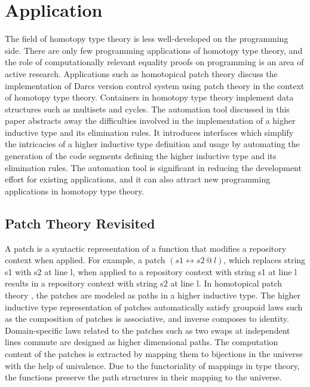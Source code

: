 \documentclass[sigplan,10pt]{acmart}
\begin{document}
\section{Application}

The field of homotopy type theory is less well-developed on the programming side. There are only few programming applications of homotopy type theory, and the role of computationally relevant equality proofs on programming is an area of active research. Applications such as homotopical patch theory \cite{Angiuli-2014} discuss the implementation of Darcs \cite{Darcs-2005} version control system using patch theory \cite{Mimram-2013} \cite{Jason-2009} in the context of homotopy type theory. Containers in homotopy type theory \cite{Altenkirch-2014} \cite{Abbott-2005} implement data structures such as multisets and cycles. The automation tool discussed in this paper abstracts away the difficulties involved in the implementation of a higher inductive type and its elimination rules. It introduces interfaces which simplify the intricacies of a higher inductive type definition and usage by automating the generation of the code segments defining the higher inductive type and its elimination rules. The automation tool is significant in reducing the development effort for existing applications, and it can also attract new programming applications in homotopy type theory.


\subsection{Patch Theory Revisited}
\label{patch-theory}

A patch is a syntactic representation of a function that modifies a repository context when applied. For example, a patch $(s1 \leftrightarrow s2 \, @ \, l)$, which replaces string s1 with s2 at line l, when applied to a repository context with string s1 at line l results in a repository context with string s2 at line l. In homotopical patch theory \cite{Angiuli-2014}, the patches are modeled as paths in a higher inductive type. The higher inductive type representation of patches automatically satisfy groupoid laws such as the composition of patches is associative, and inverse composes to identity. Domain-specific laws related to the patches such as two swaps at independent lines commute are designed as higher dimensional paths. The computation content of the patches is extracted by mapping them to bijections in the universe with the help of univalence. Due to the functoriality of mappings in type theory, the functions preserve the path structures in their mapping to the universe.
\end{document}
